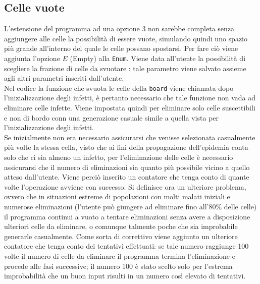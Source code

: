 \documentclass[a4paper]{article}
\begin{document}
\subsection{Celle vuote}
L'estensione del programma ad una opzione 3 non sarebbe completa senza aggiungere alle celle la possibilità di essere vuote, simulando quindi uno spazio più grande all'interno del quale le celle possano spostarsi. Per fare ciò viene aggiunta l'opzione $E$ (Empty) alla \texttt{Enum}. Viene data all'utente la possibilità di scegliere la frazione di celle da svuotare : tale parametro viene salvato assieme agli altri parametri inseriti dall'utente.\\
Nel codice la funzione che svuota le celle della \texttt{board} viene chiamata dopo l'inizializzazione degli infetti, è pertanto necessario che tale funzione non vada ad eliminare celle infette. Viene impostata quindi per eliminare solo celle suscettibili e non di bordo conn una generazione casuale simile a quella vista per l'inizializzazione degli infetti.\\
Se inizialmente non era necessario assicurarsi che venisse selezionata casualmente più volte la stessa cella, visto che ai fini della propagazione dell'epidemia conta solo che ci sia almeno un infetto, per l'eliminazione delle celle è necessario assicurarsi che il numero di eliminazioni sia quanto più possibile vicino a quello atteso dall'utente. Viene perciò inserito un contatore che tenga conto di quante volte l'operazione avviene con successo. Si definisce ora un ulteriore problema, ovvero che in situazioni estreme di popolazioni con molti malati iniziali e numerose eliminazioni (l'utente può giungere ad eliminare fino all'80\% delle celle) il programma continui a vuoto a tentare eliminazioni senza avere a disposizione ulteriori celle da eliminare, o comunque talmente poche che sia improbabile generarle casualmente. Come sorta di correttivo viene aggiunto un ulteriore contatore che tenga conto dei tentativi effettuati: se tale numero raggiunge 100 volte il numero di celle da eliminare il programma termina l'eliminazione e procede alle fasi successive; il numero 100 è stato scelto solo per l'estrema improbabilità che un buon input risulti in un numero così elevato di tentativi.\\
\end{document}
